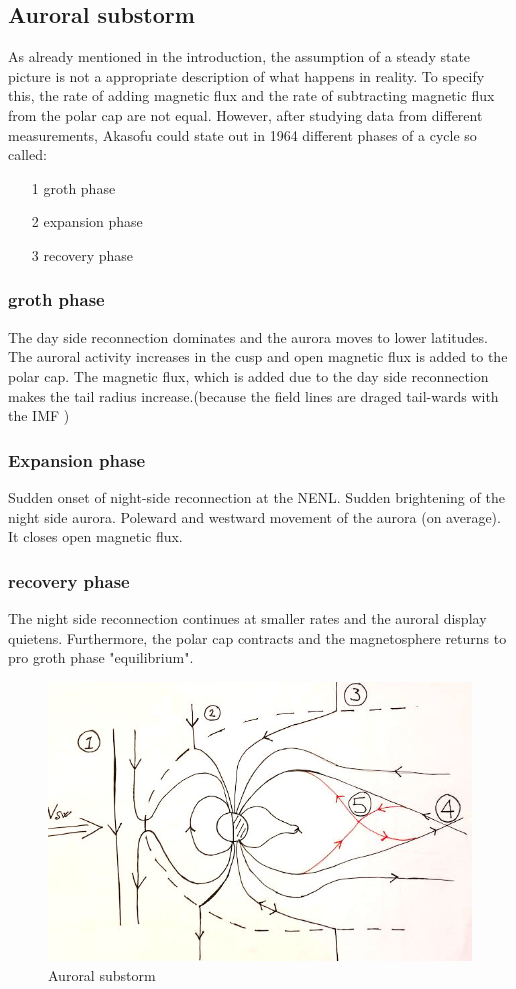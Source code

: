 \documentclass[10pt,a4paper]{article}
\begin{document}
\subsection{Auroral substorm}
As already mentioned in the introduction, the assumption of a steady state picture is not a appropriate description of what happens in reality. To specify this, the rate of adding magnetic flux and the rate of subtracting magnetic flux from the polar cap are not equal. However, after studying data from different measurements, Akasofu could state out in 1964 different phases of a cycle so called:
\begin{itemize}
\item[1] groth phase
\item[2] expansion phase
\item[3] recovery phase
\end{itemize}
\subsubsection{groth phase}
The day side reconnection dominates and the aurora moves to lower latitudes. The auroral activity increases in the cusp and open magnetic flux is added to the polar cap. The magnetic flux, which is added due to the day side reconnection makes the tail radius increase.(because the field lines are draged tail-wards with the IMF )
\subsubsection{Expansion phase}
Sudden onset of night-side reconnection at the NENL. Sudden brightening of the night side aurora. Poleward and westward movement of the aurora (on average). It closes open magnetic flux. 
\subsubsection{recovery phase}
The night side reconnection continues at smaller rates and the auroral display quietens. Furthermore, the polar cap contracts and the magnetosphere returns to pro groth phase "equilibrium". 
\begin{figure}[h]
\centering
\caption{Auroral substorm}
\label{aurora substorm}
\includegraphics[scale=0.5]{solvind2.jpg}
\end{figure}
\end{document}
